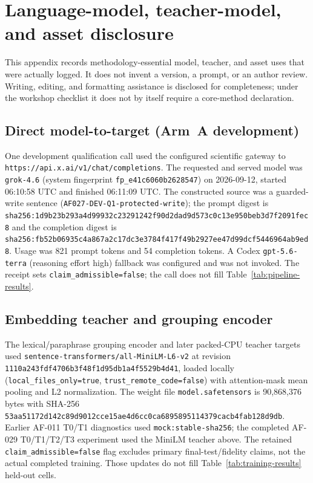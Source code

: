 \section{Language-model, teacher-model, and asset disclosure}
\label{app:llm}

This appendix records methodology-essential model, teacher, and asset uses that
were actually logged. It does not invent a version, a prompt, or an author
review. Writing, editing, and formatting assistance is disclosed for
completeness; under the workshop checklist it does not by itself require a
core-method declaration.

\subsection{Direct model-to-target (Arm~A development)}
\label{app:llm-grok}
One development qualification call used the configured scientific gateway to
\texttt{https://api.x.ai/v1/chat/completions}. The requested and served model
was \texttt{grok-4.6} (system fingerprint \texttt{fp\_e41c6060b2628547}) on
2026-09-12, started 06:10:58 UTC and finished 06:11:09 UTC. The constructed
source was a guarded-write sentence
(\texttt{AF027-DEV-Q1-protected-write}); the prompt digest is
{\scriptsize\texttt{sha256:1d9b23b293a4d99932c23291242f90d2dad9d573c0c13e950beb3d7f2091fec8}}
and the completion digest is
{\scriptsize\texttt{sha256:fb52b06935c4a867a2c17dc3e3784f417f49b2927ee47d99dcf5446964ab9ed8}}.
Usage was 821 prompt tokens and 54 completion tokens. A Codex
\texttt{gpt-5.6-terra} (reasoning effort high) fallback was configured and was
not invoked. The receipt sets \texttt{claim\_admissible=false}; the call does
not fill Table~\ref{tab:pipeline-results}.

\subsection{Embedding teacher and grouping encoder}
\label{app:llm-minilm}
The lexical/paraphrase grouping encoder and later packed-CPU teacher targets
used \texttt{sentence-transformers/all-MiniLM-L6-v2} at revision
\texttt{1110a243fdf4706b3f48f1d95db1a4f5529b4d41}, loaded locally
(\texttt{local\_files\_only=true}, \texttt{trust\_remote\_code=false}) with
attention-mask mean pooling and L2 normalization. The weight file
\texttt{model.safetensors} is 90{,}868{,}376 bytes with SHA-256
\texttt{53aa51172d142c89d9012cce15ae4d6cc0ca6895895114379cacb4fab128d9db}.
Earlier AF-011 T0/T1 diagnostics used
\texttt{mock:stable-sha256}; the completed AF-029 T0/T1/T2/T3 experiment used the MiniLM teacher above.
The retained \texttt{claim\_admissible=false} flag excludes primary final-test/fidelity claims, not the actual completed training. Those updates do not fill
Table~\ref{tab:training-results} held-out cells.


